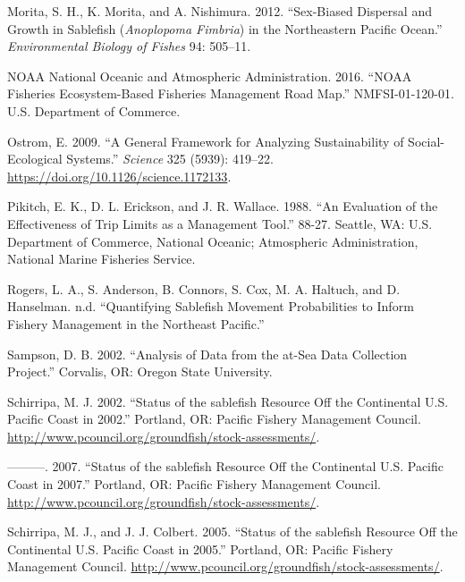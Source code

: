 \documentclass[11pt,
  english,
  a4paper,
]{article}
\begin{document}
\begin{cslreferences}
\leavevmode\hypertarget{ref-morita2012envbiofishsex}{}%
Morita, S. H., K. Morita, and A. Nishimura. 2012. ``Sex-Biased Dispersal and Growth in Sablefish (\emph{Anoplopoma Fimbria}) in the Northeastern Pacific Ocean.'' \emph{Environmental Biology of Fishes} 94: 505--11.

\leavevmode\hypertarget{ref-noaa2016}{}%
NOAA National Oceanic and Atmospheric Administration. 2016. ``NOAA Fisheries Ecosystem-Based Fisheries Management Road Map.'' NMFSI-01-120-01. U.S. Department of Commerce.

\leavevmode\hypertarget{ref-ostrom2009}{}%
Ostrom, E. 2009. ``A General Framework for Analyzing Sustainability of Social-Ecological Systems.'' \emph{Science} 325 (5939): 419--22. \url{https://doi.org/10.1126/science.1172133}.

\leavevmode\hypertarget{ref-pikitch1988usdoc}{}%
Pikitch, E. K., D. L. Erickson, and J. R. Wallace. 1988. ``An Evaluation of the Effectiveness of Trip Limits as a Management Tool.'' 88-27. Seattle, WA: U.S. Department of Commerce, National Oceanic; Atmospheric Administration, National Marine Fisheries Service.

\leavevmode\hypertarget{ref-rogers2020}{}%
Rogers, L. A., S. Anderson, B. Connors, S. Cox, M. A. Haltuch, and D. Hanselman. n.d. ``Quantifying Sablefish Movement Probabilities to Inform Fishery Management in the Northeast Pacific.''

\leavevmode\hypertarget{ref-sampson2002}{}%
Sampson, D. B. 2002. ``Analysis of Data from the at-Sea Data Collection Project.'' Corvalis, OR: Oregon State University.

\leavevmode\hypertarget{ref-schirripa2002sablefish}{}%
Schirripa, M. J. 2002. ``Status of the sablefish Resource Off the Continental U.S. Pacific Coast in 2002.'' Portland, OR: Pacific Fishery Management Council. \url{http://www.pcouncil.org/groundfish/stock-assessments/}.

\leavevmode\hypertarget{ref-schirripa2007sablefish}{}%
---------. 2007. ``Status of the sablefish Resource Off the Continental U.S. Pacific Coast in 2007.'' Portland, OR: Pacific Fishery Management Council. \url{http://www.pcouncil.org/groundfish/stock-assessments/}.

\leavevmode\hypertarget{ref-schirripa2005sablefish}{}%
Schirripa, M. J., and J. J. Colbert. 2005. ``Status of the sablefish Resource Off the Continental U.S. Pacific Coast in 2005.'' Portland, OR: Pacific Fishery Management Council. \url{http://www.pcouncil.org/groundfish/stock-assessments/}.


\end{cslreferences}
\end{document}
